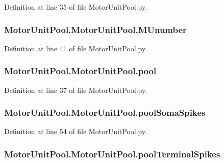 Definition at line 35 of file Motor\-Unit\-Pool.\-py.

\hypertarget{class_motor_unit_pool_1_1_motor_unit_pool_aa5884530baaa20f46007805bc574407d}{
\subsubsection[{M\-Unumber}]{\setlength{\rightskip}{0pt plus 5cm}Motor\-Unit\-Pool.\-Motor\-Unit\-Pool.\-M\-Unumber}}\label{class_motor_unit_pool_1_1_motor_unit_pool_aa5884530baaa20f46007805bc574407d}


Definition at line 41 of file Motor\-Unit\-Pool.\-py.

\hypertarget{class_motor_unit_pool_1_1_motor_unit_pool_a832364dc014aa8a1b2947abfe063f626}{
\subsubsection[{pool}]{\setlength{\rightskip}{0pt plus 5cm}Motor\-Unit\-Pool.\-Motor\-Unit\-Pool.\-pool}}\label{class_motor_unit_pool_1_1_motor_unit_pool_a832364dc014aa8a1b2947abfe063f626}


Definition at line 37 of file Motor\-Unit\-Pool.\-py.

\hypertarget{class_motor_unit_pool_1_1_motor_unit_pool_a3790757a111061662ad0f98120b25e69}{
\subsubsection[{pool\-Soma\-Spikes}]{\setlength{\rightskip}{0pt plus 5cm}Motor\-Unit\-Pool.\-Motor\-Unit\-Pool.\-pool\-Soma\-Spikes}}\label{class_motor_unit_pool_1_1_motor_unit_pool_a3790757a111061662ad0f98120b25e69}


Definition at line 54 of file Motor\-Unit\-Pool.\-py.

\hypertarget{class_motor_unit_pool_1_1_motor_unit_pool_a4f0b93df27eb6303fa1a3d49653d4fd3}{
\subsubsection[{pool\-Terminal\-Spikes}]{\setlength{\rightskip}{0pt plus 5cm}Motor\-Unit\-Pool.\-Motor\-Unit\-Pool.\-pool\-Terminal\-Spikes}}\label{class_motor_unit_pool_1_1_motor_unit_pool_a4f0b93df27eb6303fa1a3d49653d4fd3}


